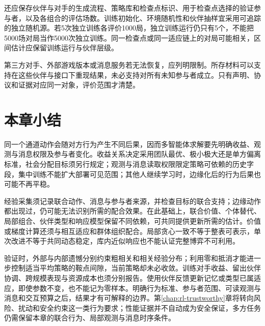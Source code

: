 还应保存伙伴与对手的生成流程、策略库和检查点标识、用于检查点选择的验证参与者，以及各组合的评估场数。训练初始化、环境随机性和伙伴抽样宜采用可追踪的独立随机源。若5次独立训练各评价1000局，独立训练运行仍只有5个，不能把5000场对局当作5000次独立训练。同一检查点或同一适应链上的对局可能相关，区间估计应保留训练运行与伙伴层级。

第三方对手、外部游戏版本或消息服务若无法恢复，应列明限制。所存材料可以支持在这些伙伴与接口下重现结果，未必支持对所有未知参与者成立。只有声明、协议和证据对应同一对象，评价范围才清楚。

\section{本章小结}
\label{sec:rl-multi-agent-summary}

同一个通道动作会随对方行为产生不同后果，因而多智能体求解要先明确收益、观测与消息权限及参与者变化。收益关系决定采用团队最优、极小极大还是单方偏离标准，社会分配目标须另行规定；观测与消息读取权限限定策略可依赖的历史字段，集中训练不能扩大部署可见范围；其他人继续学习时，边缘化后的行为后果也可能不再平稳。

经验采集须记录联合动作、消息与参与者来源，并检查目标的联合支持；边缘动作都出现过，仍可能无法识别所需的配合效果。在此基础上，联合价值、个体替代、局部组合、伙伴类型和响应模型保留不同依赖，可共同提供更新所需的估计。价值或梯度计算还须与相互适应和群体组织配合。局部贪心一致不等于整表可表示，单次改进不等于共同动态稳定，库内近似响应也不能认证完整博弈不可利用。

验证时，外部与内部遗憾分别约束粗相关和相关经验分布；利用零和抵消才能进一步控制适当平均策略的鞍点间隙，当前策略却未必收敛。训练对手收益、留出伙伴协调、跨规模表现与资源成本也须分别报告。使用伙伴反馈更新记忆或类型已属适应，即使参数不变，也不能记为零样本。明确行为标准、参与者范围、可读观测与消息和交互预算之后，结果才有可解释的边界。第\ref{chap:rl-trustworthy}章将转向风险、扰动和安全约束这一类行为要求；性能证据并不自动成为安全保证，多方任务仍需保留本章的联合行为、局部观测与消息时序条件。
